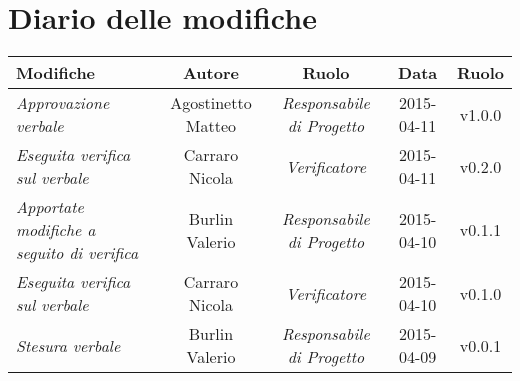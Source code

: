\newpage
\section*{Diario delle modifiche}

\begin{table}[h]
\centering
\begin{tabular}{|p{}|c|c|c|c|}
	\toprule
		\textbf{Modifiche} & \textbf{Autore} & \textbf{Ruolo} & \textbf{Data} & \textbf{Ruolo} \\
	\midrule
	\midrule
		\textit{Approvazione verbale} & Agostinetto Matteo & \textit{Responsabile di Progetto} & 2015-04-11 & v1.0.0 \\									
	\midrule
		\textit{Eseguita verifica sul verbale} & Carraro Nicola & \textit{Verificatore} & 2015-04-11 & v0.2.0 \\
	\midrule
		\textit{Apportate modifiche a seguito di verifica} & Burlin Valerio & \textit{Responsabile di Progetto} & 2015-04-10 & v0.1.1 \\
	\midrule
		\textit{Eseguita verifica sul verbale} & Carraro Nicola & \textit{Verificatore} & 2015-04-10 & v0.1.0 \\		                               
	\midrule
		\textit{Stesura verbale} & Burlin Valerio & \textit{Responsabile di Progetto} & 2015-04-09 & v0.0.1 \\                         
	\bottomrule
\end{tabular}	
\end{table}

\newpage